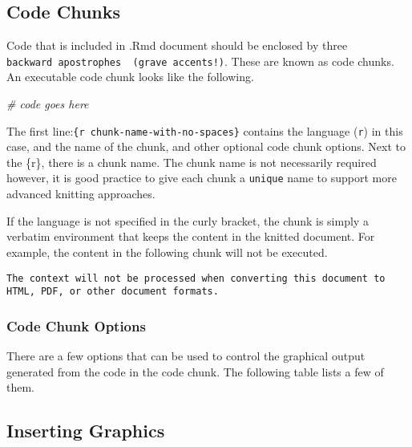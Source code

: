 \documentclass[
]{article}
\newenvironment{Shaded}{\begin{snugshade}}{\end{snugshade}}
\newcommand{\CommentTok}[1]{\textcolor[rgb]{0.56,0.35,0.01}{\textit{#1}}}
\begin{document}
\hypertarget{code-chunks}{%
\subsection{Code Chunks}\label{code-chunks}}

Code that is included in .Rmd document should be enclosed by three
\texttt{backward\ apostrophes\ \textasciigrave{}\textasciigrave{}\textasciigrave{}\ (grave\ accents!)}.
These are known as code chunks. An executable code chunk looks like the
following.

\begin{Shaded}
\begin{Highlighting}[]
\CommentTok{\# code goes here}
\end{Highlighting}
\end{Shaded}

The first
line:\texttt{\textasciigrave{}\textasciigrave{}\textasciigrave{}\{r\ chunk-name-with-no-spaces\}}
contains the language (\texttt{r}) in this case, and the name of the
chunk, and other optional code chunk options. Next to the \{r\}, there
is a chunk name. The chunk name is not necessarily required however, it
is good practice to give each chunk a \texttt{unique} name to support
more advanced knitting approaches.

If the language is not specified in the curly bracket, the chunk is
simply a verbatim environment that keeps the content in the knitted
document. For example, the content in the following chunk will not be
executed.

\begin{verbatim}
The context will not be processed when converting this document to HTML, PDF, or other document formats.
\end{verbatim}

\hypertarget{code-chunk-options}{%
\subsubsection{Code Chunk Options}\label{code-chunk-options}}

There are a few options that can be used to control the graphical output
generated from the code in the code chunk. The following table lists a
few of them.

\hypertarget{inserting-graphics}{%
\subsection{Inserting Graphics}\label{inserting-graphics}}
\end{document}
